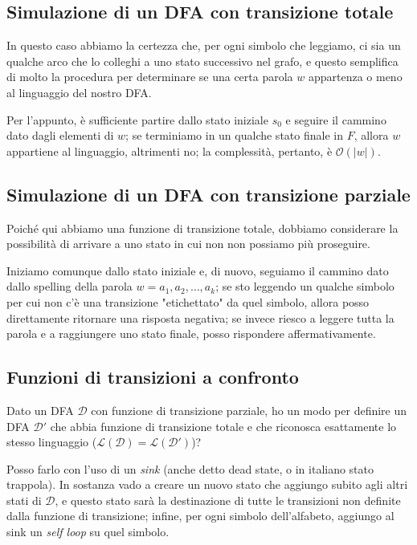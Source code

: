 \documentclass[class=book, crop=false, oneside, 12pt]{standalone}
\begin{document}
\subsection{Simulazione di un DFA con transizione totale}
In questo caso abbiamo la certezza che, per ogni  simbolo che leggiamo, ci sia un qualche arco che lo colleghi a uno stato successivo nel grafo, e questo semplifica di molto la procedura per determinare se una certa parola \(w\) appartenza o meno al linguaggio del nostro DFA.

Per l'appunto, è sufficiente partire dallo stato iniziale \(s_0\) e seguire il cammino dato dagli elementi di \(w\); se terminiamo in un qualche stato finale in \(F\), allora \(w\) appartiene al linguaggio, altrimenti no; la complessità, pertanto, è \(\mathcal{O}(|w|)\).

\subsection{Simulazione di un DFA con transizione parziale}
Poiché qui abbiamo una funzione di transizione totale, dobbiamo considerare la possibilità di arrivare a uno stato in cui non non possiamo più proseguire. 

Iniziamo comunque dallo stato iniziale e, di nuovo, seguiamo il cammino dato dallo spelling della parola \(w = a_1, a_2, \ldots, a_k\); se sto leggendo un qualche simbolo per cui non c'è una transizione "etichettato" da quel simbolo, allora posso direttamente ritornare una risposta negativa; se invece riesco a leggere tutta la parola e a raggiungere uno stato finale, posso rispondere affermativamente.

\subsection{Funzioni di transizioni a confronto}
Dato un DFA \(\mathcal{D}\) con funzione di transizione parziale, ho un modo per definire un DFA \(\mathcal{D}'\) che abbia funzione di transizione totale e che riconosca esattamente lo stesso linguaggio (\(\mathcal{L(D) = \mathcal{L}(\mathcal{D}')}\))?

Posso farlo con l'uso di un \emph{sink} (anche detto dead state, o in italiano stato trappola). In sostanza vado a creare un nuovo stato che aggiungo subito agli altri stati di \(\mathcal{D}\), e questo stato sarà la destinazione di tutte le transizioni non definite dalla funzione di transizione; infine, per ogni simbolo dell'alfabeto, aggiungo al sink un \emph{self loop} su quel simbolo.
\end{document}
